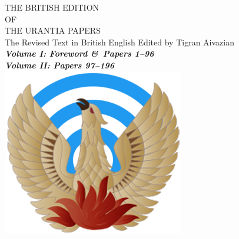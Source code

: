 
\makeatletter
{}%
\makeatother

\begin{center}
{
\booktitlefontsize THE BRITISH  EDITION\\
\offontsize OF\\
\booksubtitlefontsize THE URANTIA PAPERS\\
}%
{%
\subsubtitlefontsize
The Revised Text in British English
Edited by Tigran Aivazian\\[2ex]
}%
\ifmultivol
\LARGE\bfseries\itshape
\ifvoli Volume I: Foreword \&\ Papers 1--96\\\fi
\ifvolii Volume II: Papers 97--196\\\fi
\fi
{}
\includegraphics[width=\phoenixscale\columnwidth]{images/Phoenix-Logo-Circles.jpg}\\
\titlesepbig\\
\end{center}

